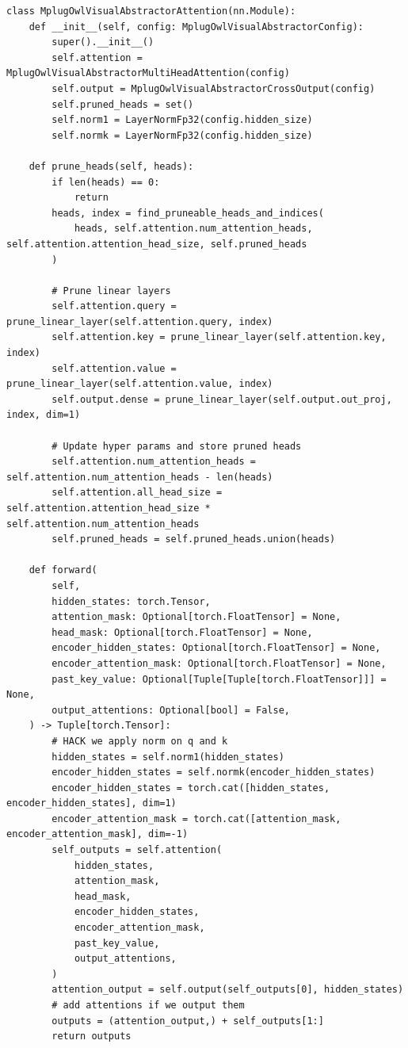 \documentclass[zihao=false,fontset=windows]{ctexart}
\begin{document}
\begin{feishucode}
\begin{lstlisting}
class MplugOwlVisualAbstractorAttention(nn.Module):
    def __init__(self, config: MplugOwlVisualAbstractorConfig):
        super().__init__()
        self.attention = MplugOwlVisualAbstractorMultiHeadAttention(config)
        self.output = MplugOwlVisualAbstractorCrossOutput(config)
        self.pruned_heads = set()
        self.norm1 = LayerNormFp32(config.hidden_size)
        self.normk = LayerNormFp32(config.hidden_size)

    def prune_heads(self, heads):
        if len(heads) == 0:
            return
        heads, index = find_pruneable_heads_and_indices(
            heads, self.attention.num_attention_heads, self.attention.attention_head_size, self.pruned_heads
        )

        # Prune linear layers
        self.attention.query = prune_linear_layer(self.attention.query, index)
        self.attention.key = prune_linear_layer(self.attention.key, index)
        self.attention.value = prune_linear_layer(self.attention.value, index)
        self.output.dense = prune_linear_layer(self.output.out_proj, index, dim=1)

        # Update hyper params and store pruned heads
        self.attention.num_attention_heads = self.attention.num_attention_heads - len(heads)
        self.attention.all_head_size = self.attention.attention_head_size * self.attention.num_attention_heads
        self.pruned_heads = self.pruned_heads.union(heads)

    def forward(
        self,
        hidden_states: torch.Tensor,
        attention_mask: Optional[torch.FloatTensor] = None,
        head_mask: Optional[torch.FloatTensor] = None,
        encoder_hidden_states: Optional[torch.FloatTensor] = None,
        encoder_attention_mask: Optional[torch.FloatTensor] = None,
        past_key_value: Optional[Tuple[Tuple[torch.FloatTensor]]] = None,
        output_attentions: Optional[bool] = False,
    ) -> Tuple[torch.Tensor]:
        # HACK we apply norm on q and k
        hidden_states = self.norm1(hidden_states)
        encoder_hidden_states = self.normk(encoder_hidden_states)
        encoder_hidden_states = torch.cat([hidden_states, encoder_hidden_states], dim=1)
        encoder_attention_mask = torch.cat([attention_mask, encoder_attention_mask], dim=-1)
        self_outputs = self.attention(
            hidden_states,
            attention_mask,
            head_mask,
            encoder_hidden_states,
            encoder_attention_mask,
            past_key_value,
            output_attentions,
        )
        attention_output = self.output(self_outputs[0], hidden_states)
        # add attentions if we output them
        outputs = (attention_output,) + self_outputs[1:]
        return outputs
\end{lstlisting}
\end{feishucode}
\end{document}
